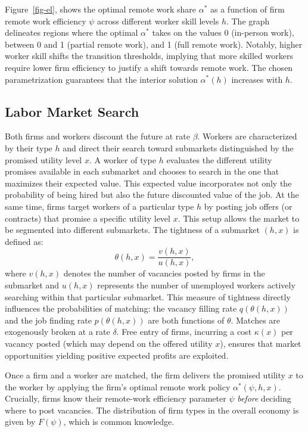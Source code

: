 \documentclass[
  11pt,
  letterpaper,
  DIV=11,
  numbers=noendperiod]{scrartcl}
\theoremstyle{plain}
\theoremstyle{remark}
\begin{document}
Figure~\ref{fig-el}, shows the optimal remote work share \(\alpha^*\) as
a function of firm remote work efficiency \(\psi\) across different
worker skill levels \(h\). The graph delineates regions where the
optimal \(\alpha^*\) takes on the values 0 (in-person work), between 0
and 1 (partial remote work), and 1 (full remote work). Notably, higher
worker skill shifts the transition thresholds, implying that more
skilled workers require lower firm efficiency to justify a shift towards
remote work. The chosen parametrization guarantees that the interior
solution \(\alpha^*(h)\) increases with \(h\).

\subsection{Labor Market Search}\label{sec-labor-market-search}

Both firms and workers discount the future at rate \(\beta\). Workers
are characterized by their type \(h\) and direct their search toward
submarkets distinguished by the promised utility level \(x\). A worker
of type \(h\) evaluates the different utility promises available in each
submarket and chooses to search in the one that maximizes their expected
value. This expected value incorporates not only the probability of
being hired but also the future discounted value of the job. At the same
time, firms target workers of a particular type \(h\) by posting job
offers (or contracts) that promise a specific utility level \(x\). This
setup allows the market to be segmented into different submarkets. The
tightness of a submarket \((h, x)\) is defined as:
\[ \theta(h, x) = \frac{v(h, x)}{u(h, x)}, \] where \(v(h, x)\) denotes
the number of vacancies posted by firms in the submarket and \(u(h, x)\)
represents the number of unemployed workers actively searching within
that particular submarket. This measure of tightness directly influences
the probabilities of matching: the vacancy filling rate
\(q(\theta(h, x))\) and the job finding rate \(p(\theta(h, x))\) are
both functions of \(\theta\). Matches are exogenously broken at a rate
\(\delta\). Free entry of firms, incurring a cost \(\kappa(x)\) per
vacancy posted (which may depend on the offered utility \(x\)), ensures
that market opportunities yielding positive expected profits are
exploited.

Once a firm and a worker are matched, the firm delivers the promised
utility \(x\) to the worker by applying the firm's optimal remote work
policy \(\alpha^*(\psi, h, x)\). Crucially, firms know their remote-work
efficiency parameter \(\psi\) \emph{before} deciding where to post
vacancies. The distribution of firm types in the overall economy is
given by \(F(\psi)\), which is common knowledge.
\end{document}
